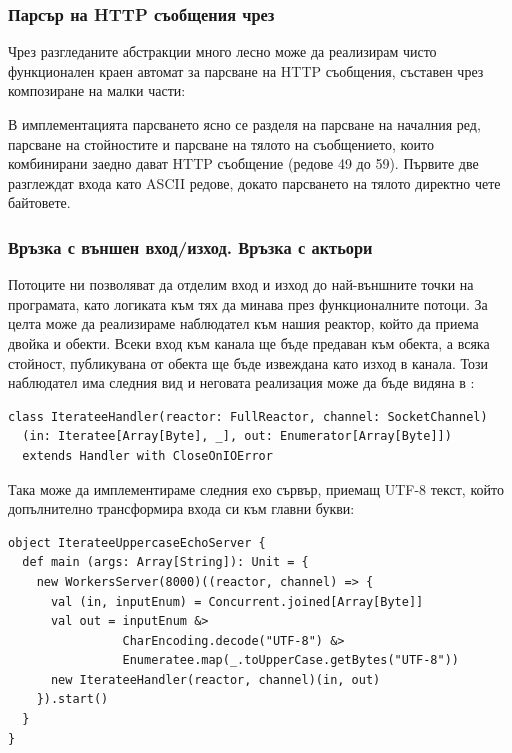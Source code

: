 \subsubsection{Парсър на HTTP съобщения чрез }

Чрез разгледаните абстракции много лесно може да реализирам чисто функционален краен автомат за парсване на HTTP съобщения, съставен чрез композиране на малки части:



В имплементацията парсването ясно се разделя на парсване на началния ред, парсване на  стойностите и парсване на тялото на съобщението, които комбинирани заедно дават HTTP съобщение (редове 49 до 59). Първите две разглеждат входа като ASCII редове, докато парсването на тялото директно чете байтовете.

\subsubsection{Връзка с външен вход/изход. Връзка с актьори}

Потоците ни позволяват да отделим вход и изход до най-външните точки на програмата, като логиката към тях да минава през функционалните потоци. За целта може да реализираме наблюдател към нашия реактор, който да приема двойка  и  обекти. Всеки вход към канала ще бъде предаван към  обекта, а всяка стойност, публикувана от  обекта ще бъде извеждана като изход в канала. Този наблюдател има следния вид и неговата реализация може да бъде видяна в :

\begin{lstlisting}
class IterateeHandler(reactor: FullReactor, channel: SocketChannel)
  (in: Iteratee[Array[Byte], _], out: Enumerator[Array[Byte]])
  extends Handler with CloseOnIOError
\end{lstlisting}

Така може да имплементираме следния ехо сървър, приемащ UTF-8 текст, който допълнително трансформира входа си към главни букви:

\begin{lstlisting}
object IterateeUppercaseEchoServer {
  def main (args: Array[String]): Unit = {
    new WorkersServer(8000)((reactor, channel) => {
      val (in, inputEnum) = Concurrent.joined[Array[Byte]]
      val out = inputEnum &>
                CharEncoding.decode("UTF-8") &>
                Enumeratee.map(_.toUpperCase.getBytes("UTF-8"))
      new IterateeHandler(reactor, channel)(in, out)
    }).start()
  }
}
\end{lstlisting}


